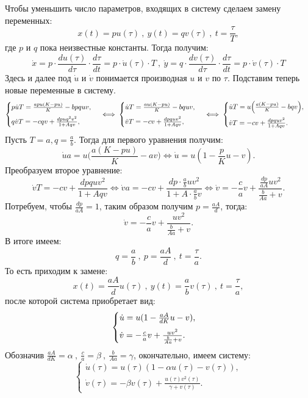 \documentclass[10pt]{article}
\numberwithin{equation}{section}
\begin{document}
Чтобы уменьшить число параметров, входящих в систему сделаем замену переменных:
\[ x(t) = pu(\tau) \ , \ y(t) = qv(\tau) \ , \ t = \frac{\tau}{T}, \]
где \( p \) и \( q \) пока неизвестные константы. Тогда получим:
\[ \dot{x} = p \cdot \frac{du(\tau)}{d\tau} \cdot \frac{d\tau}{dt} = p \cdot \dot{u}(\tau) \cdot T \ , \ \dot{y} = q \cdot \frac{dv(\tau)}{d\tau} \cdot \frac{d\tau}{dt} = p \cdot \dot{v}(\tau) \cdot T\]
Здесь и далее под \( \dot{u} \) и \( \dot{v}\) понимается производная \( u \) и \( v \) по \( \tau \). Подставим теперь новые переменные в систему.
\[ \begin{cases} p\dot{u}T = \frac{apu(K - pu)}{K} - bpquv, \medskip\\ q\dot{v}T = -cqv + \frac{dpuq^2v^2}{1 + Aqv}, \end{cases} \iff \begin{cases} \dot{u}T = \frac{au(K - pu)}{K} - bquv, \medskip\\ \dot{v}T = -cv + \frac{dpquv^2}{1+Aqv}, \end{cases} \iff \begin{cases} \dot{u}T = u \Big( \frac{a(K - pu)}{K} - bqv \Big), \medskip\\ \dot{v}T = -cv + \frac{dpquv^2}{1+Aqv}. \end{cases} \]
Пусть \( T = a , q = \frac{a}{b} \). Тогда для первого уравнения получим:
\[ \dot{u}a = u\Big(\frac{a(K - pu)}{K} - av\Big) \iff \dot{u} = u(1 - \frac{p}{K}u - v). \]
Преобразуем второе уравнение:
\[ \dot{v}T = -cv + \frac{dpquv^2}{1+Aqv} \iff \dot{v}a = -cv + \frac{dp \cdot \frac{a}{b} uv^2}{1+A \cdot \frac{a}{b} v} \iff \dot{v} = -\frac{c}{a}v + \frac{\frac{dp}{aA}uv^2}{\frac{b}{Aa} + v} . \] 
Потребуем, чтобы \( \frac{dp}{aA} = 1 \), таким образом получим \( p = \frac{aA}{d} \), тогда:
\[ \dot{v} = -\frac{c}{a}v + \frac{uv^2}{\frac{b}{Aa} + v} .\]
В итоге имеем:
\[ q = \frac{a}{b} \ , \ p = \frac{aA}{d} \ , \ t = \frac{\tau}{a}. \]
То есть приходим к замене:
\[ x(t) = \frac{aA}{d}u(\tau) \ , \ y(t) = \frac{a}{b}v(\tau) \ , \ t = \frac{\tau}{a}, \]
после которой система приобретает вид:
\[  \begin{cases} \dot{u} = u( 1 - \frac{aA}{dK}u - v), \medskip\\ \dot{v} = -\frac{c}{a}v + \frac{uv^2}{\frac{b}{Aa} + v}. \end{cases} \]
Обозначив \( \frac{aA}{dK} = \alpha \ , \ \frac{c}{a} = \beta \ , \ \frac{b}{Aa} = \gamma \), окончательно, имеем систему:
\begin{equation}\label{new_system}
	\begin{cases}
		\dot{u}(\tau) = u(\tau)(1 - \alpha u(\tau) - v(\tau)), \\
		\dot{v}(\tau) = -\beta v(\tau) + \frac{u(\tau)v^2(\tau)}{\gamma + v(\tau)}.
	\end{cases}
\end{equation}
\end{document}
